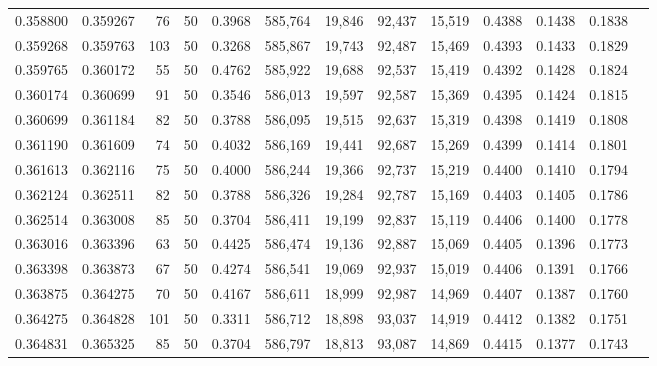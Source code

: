 \begin{tabular}{rrrrrrrrrrrrr}
0.358800 & 0.359267 &    76 &  50 &                                     0.3968 & 585,764 &  19,846 &  92,437 &  15,519 & 0.4388 & 0.1438 & 0.1838 \\
0.359268 & 0.359763 &   103 &  50 &                                     0.3268 & 585,867 &  19,743 &  92,487 &  15,469 & 0.4393 & 0.1433 & 0.1829 \\
0.359765 & 0.360172 &    55 &  50 &                                     0.4762 & 585,922 &  19,688 &  92,537 &  15,419 & 0.4392 & 0.1428 & 0.1824 \\
0.360174 & 0.360699 &    91 &  50 &                                     0.3546 & 586,013 &  19,597 &  92,587 &  15,369 & 0.4395 & 0.1424 & 0.1815 \\
0.360699 & 0.361184 &    82 &  50 &                                     0.3788 & 586,095 &  19,515 &  92,637 &  15,319 & 0.4398 & 0.1419 & 0.1808 \\
0.361190 & 0.361609 &    74 &  50 &                                     0.4032 & 586,169 &  19,441 &  92,687 &  15,269 & 0.4399 & 0.1414 & 0.1801 \\
0.361613 & 0.362116 &    75 &  50 &                                     0.4000 & 586,244 &  19,366 &  92,737 &  15,219 & 0.4400 & 0.1410 & 0.1794 \\
0.362124 & 0.362511 &    82 &  50 &                                     0.3788 & 586,326 &  19,284 &  92,787 &  15,169 & 0.4403 & 0.1405 & 0.1786 \\
0.362514 & 0.363008 &    85 &  50 &                                     0.3704 & 586,411 &  19,199 &  92,837 &  15,119 & 0.4406 & 0.1400 & 0.1778 \\
0.363016 & 0.363396 &    63 &  50 &                                     0.4425 & 586,474 &  19,136 &  92,887 &  15,069 & 0.4405 & 0.1396 & 0.1773 \\
0.363398 & 0.363873 &    67 &  50 &                                     0.4274 & 586,541 &  19,069 &  92,937 &  15,019 & 0.4406 & 0.1391 & 0.1766 \\
0.363875 & 0.364275 &    70 &  50 &                                     0.4167 & 586,611 &  18,999 &  92,987 &  14,969 & 0.4407 & 0.1387 & 0.1760 \\
0.364275 & 0.364828 &   101 &  50 &                                     0.3311 & 586,712 &  18,898 &  93,037 &  14,919 & 0.4412 & 0.1382 & 0.1751 \\
0.364831 & 0.365325 &    85 &  50 &                                     0.3704 & 586,797 &  18,813 &  93,087 &  14,869 & 0.4415 & 0.1377 & 0.1743 \\

\end{tabular}
